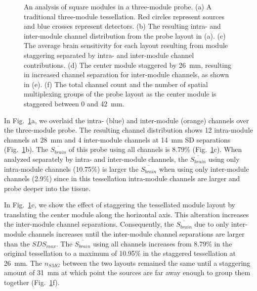 \begin{figure}
\begin{center}
\end{center}
\caption {An analysis of square modules in a three-module probe. (a) A traditional three-module tessellation. Red circles represent sources and blue crosses represent detectors. (b) The resulting intra- and inter-module channel distribution from the probe layout in (a). (c) The average brain sensitivity for each layout resulting from module staggering separated by intra- and inter-module channel contributions. (d) The center module staggered by 26~mm, resulting in increased channel separation for inter-module channels, as shown in (e). (f) The total channel count and the number of spatial multiplexing groups of the probe layout as the center module is staggered between 0 and 42~mm.}
 \label{fig:stagger}
\end{figure} 

In Fig.~\ref{fig:stagger}a, we overlaid the intra- (blue) and inter-module (orange) channels over the three-module probe. The resulting channel distribution shows 12 intra-module channels at 28~mm and 4 inter-module channels at 14~mm \ac{SD} separations (Fig.~\ref{fig:stagger}b). The $\overline{S_{brain}}$ of this probe using all channels is 8.79\% (Fig.~\ref{fig:stagger}c). When analyzed separately by intra- and inter-module channels, the $\overline{S_{brain}}$ using only intra-module channels (10.75\%) is larger the $\overline{S_{brain}}$ when using only inter-module channels (2.9\%) since in this tessellation intra-module channels are larger and probe deeper into the tissue.  

In Fig.~\ref{fig:stagger}c, we show the effect of staggering the tessellated module layout by translating the center module along the horizontal axis. This alteration increases the inter-module channel separations. Consequently, the $\overline{S_{brain}}$ due to only inter-module channels increases until the inter-module channel separations are larger than the $SDS_{max}$. The $\overline{S_{brain}}$ using all channels increases from 8.79\% in the original tessellation to a maximum of 10.95\% in the staggered tessellation at 26~mm. The $n_{SMG}$ between the two layouts remained the same until a staggering amount of 31~mm at which point the sources are far away enough to group them together (Fig.~\ref{fig:stagger}f). 



